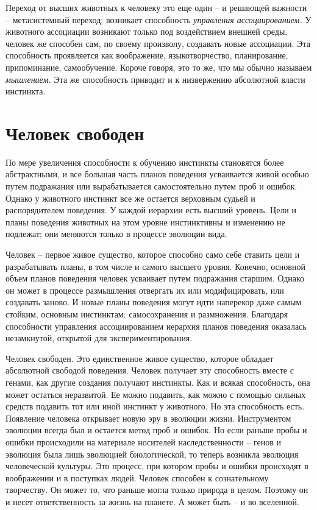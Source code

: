 \documentclass{book}
\begin{document}
Переход от высших животных к человеку это еще один -- и решающей важности -- метасистемный переход; возникает способность 
\textit{управления ассоциированием.}  У животного ассоциации возникают только под воздействием внешней среды, человек же 
способен сам, по своему произволу, создавать новые ассоциации. Эта способность проявляется как воображение, языкотворчество, 
планирование, припоминание, самообучение. Короче говоря, это то же, что мы обычно называем \textit{мышлением.}  Эта же способность 
приводит и к низвержению абсолютной власти инстинкта.


\section{Человек свободен}

По мере увеличения способности к обучению инстинкты становятся более абстрактными, и все большая часть планов поведения 
усваивается живой особью путем подражания или вырабатывается самостоятельно путем проб и ошибок. Однако у животного инстинкт все 
же остается верховным судьей и распорядителем поведения. У каждой иерархии есть высший уровень. Цели и планы поведения животных 
на этом уровне инстинктивны и изменению не подлежат; они меняются только в процессе эволюции вида.

Человек -- первое живое существо, которое способно само себе ставить цели и разрабатывать планы, в том числе и самого высшего 
уровня. Конечно, основной объем планов поведения человек усваивает путем подражания старшим. Однако он мо­жет в процессе 
размышления отвергать их или модифициро­вать, или создавать заново. И новые планы поведения могут идти наперекор даже самым 
стойким, основным инстинктам: самосохранения и размножения. Благодаря способности управ­ления ассоциированием иерархия планов 
поведения оказалась незамкнутой, открытой для экспериментирования.

Человек свободен. Это единственное живое существо, кото­рое обладает абсолютной свободой поведения. Человек полу­чает эту 
способность вместе с генами, как другие создания по­лучают инстинкты. Как и всякая способность, она может остать­ся неразвитой. Ее 
можно подавить, как можно с помощью сильных средств подавить тот или иной инстинкт у животного. Но эта способность есть.
Появление человека открывает новую эру в эволюции жиз­ни. Инструментом эволюции всегда был и остается метод проб и ошибок. Но 
если раньше пробы и ошибки происходили на материале носителей наследственности -- генов и эволюция была лишь эволюцией 
биологической, то теперь возникла эво­люция человеческой культуры. Это процесс, при котором про­бы и ошибки происходят в 
воображении и в поступках людей. Человек способен к сознательному творчеству. Он может то, что раньше могла только природа в 
целом. Поэтому он и несет ответственность за жизнь на планете. А может быть -- и во вселенной.
\end{document}
